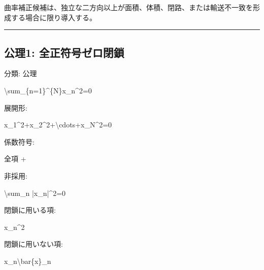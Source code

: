 \documentclass[
  a4paper,
]{ltjsarticle}
\newenvironment{Shaded}{}{}
\newcommand{\NormalTok}[1]{#1}
\begin{document}
曲率補正候補は、独立な二方向以上が面積、体積、閉路、または輸送不一致を形成する場合に限り導入する。

\begin{center}\rule{0.5\linewidth}{0.5pt}\end{center}

\subsection{公理1:
全正符号ゼロ閉鎖}\label{ux516cux74061-ux5168ux6b63ux7b26ux53f7ux30bcux30edux9589ux9396}

分類: 公理

\begin{Shaded}
\begin{Highlighting}[]
\NormalTok{\textbackslash{}sum\_\{n=1\}\^{}\{N\}x\_n\^{}2=0}
\end{Highlighting}
\end{Shaded}

展開形:

\begin{Shaded}
\begin{Highlighting}[]
\NormalTok{x\_1\^{}2+x\_2\^{}2+\textbackslash{}cdots+x\_N\^{}2=0}
\end{Highlighting}
\end{Shaded}

係数符号:

\begin{Shaded}
\begin{Highlighting}[]
\NormalTok{全項 +}
\end{Highlighting}
\end{Shaded}

非採用:

\begin{Shaded}
\begin{Highlighting}[]
\NormalTok{\textbackslash{}sum\_n |x\_n|\^{}2=0}
\end{Highlighting}
\end{Shaded}

閉鎖に用いる項:

\begin{Shaded}
\begin{Highlighting}[]
\NormalTok{x\_n\^{}2}
\end{Highlighting}
\end{Shaded}

閉鎖に用いない項:

\begin{Shaded}
\begin{Highlighting}[]
\NormalTok{x\_n\textbackslash{}bar\{x\}\_n}
\end{Highlighting}
\end{Shaded}
\end{document}
